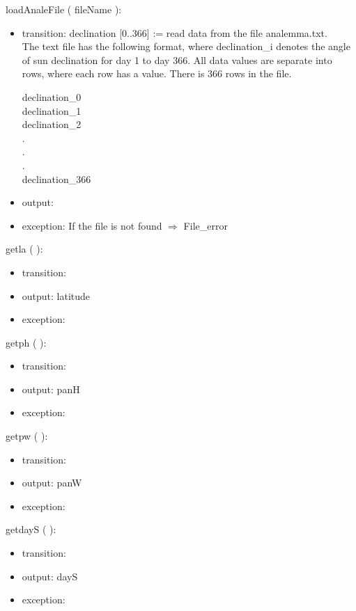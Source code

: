 \documentclass[12pt, titlepage]{article}
\begin{document}
\noindent  loadAnaleFile ( fileName ):
\begin{itemize}
\item transition: declination [0..366] := read data from the file analemma.txt.\\
The text file has the following format, where declination\_i denotes the angle of sun declination for day 1 to day 366.
All data values are separate into rows, where each row has a value. There is 366 rows in the file.
\begin{center}
declination\_0\\
declination\_1\\
declination\_2\\
.\\
.\\
.\\
declination\_366\\
\end{center}

\item output:
\item exception: If the file is not found $\Rightarrow$ File\_error
\end{itemize}

\noindent  getla ( ):
\begin{itemize}
\item transition: 
\item output: latitude
\item exception: 
\end{itemize}

\noindent  getph ( ):
\begin{itemize}
\item transition: 
\item output: panH
\item exception: 
\end{itemize}

\noindent  getpw ( ):
\begin{itemize}
\item transition: 
\item output: panW
\item exception: 
\end{itemize}

\noindent  getdayS ( ):
\begin{itemize}
\item transition: 
\item output: dayS
\item exception: 
\end{itemize}
\end{document}
